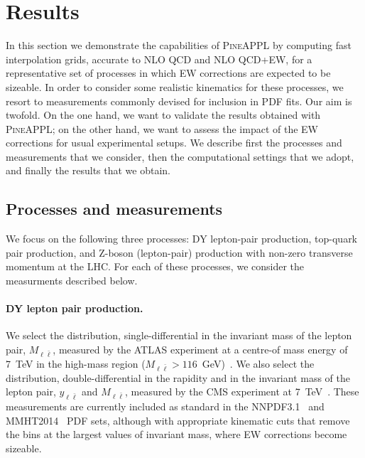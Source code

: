\section{Results}
\label{sec:results}

In this section we demonstrate the capabilities of \textsc{PineAPPL} by
computing fast interpolation grids, accurate to NLO QCD and NLO QCD+EW,
for a representative set of processes in which EW corrections are expected 
to be sizeable. In order to consider some realistic kinematics for these
processes, we resort to measurements commonly devised for inclusion in PDF
fits. Our aim is twofold. On the one hand, we want to validate the results
obtained with \textsc{PineAPPL}; on the other hand, we want to assess the
impact of the EW corrections for usual experimental setups. We describe first
the processes and measurements that we consider, then the computational
settings that we adopt, and finally the results that we obtain.

\subsection{Processes and measurements}
\label{subsec:processes_and_measurements}

We focus on the following three processes: DY lepton-pair production, top-quark
pair production, and Z-boson (lepton-pair) production with non-zero transverse
momentum at the LHC. For each of these processes, we consider the measurments
described below.

\paragraph{DY lepton pair production.}
We select the distribution, single-differential in the invariant mass of the
lepton pair, $M_{\ell \bar\ell}$, measured by the ATLAS experiment at a centre-of
mass energy of 7~TeV in the high-mass region
($M_{\ell\bar\ell}>116$~GeV)~\cite{Aad:2013iua}.
We also select the distribution, double-differential in the rapidity and in
the invariant mass of the lepton pair, $y_{\ell\bar\ell}$ and $M_{\ell\bar\ell}$,
measured by the CMS experiment at 7~TeV~\cite{Chatrchyan:2013tia}.
These measurements are currently included as standard in the
NNPDF3.1~\cite{Ball:2017nwa} and MMHT2014~\cite{Harland-Lang:2014zoa} PDF sets,
although with appropriate kinematic cuts that remove the bins at the largest
values of invariant mass, where EW corrections become sizeable.

